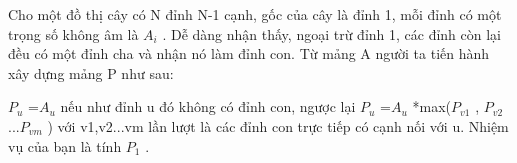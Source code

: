 Cho một đồ thị cây có N đỉnh N-1 cạnh, gốc của cây là đỉnh 1, mỗi đỉnh có một trọng số không âm là $A_{i}$   . Dễ dàng nhận thấy, ngoại trừ đỉnh 1, các đỉnh còn lại đều có một đỉnh cha và nhận nó làm đỉnh con. Từ mảng A người ta tiến hành xây dựng mảng P như sau:  

   $P_{u}$   =$A_{u}$   nếu như đỉnh u đó không có đỉnh con, ngược lại $P_{u}$   =$A_{u}$   *max($P_{v1}$   , $P_{v2}$   ...$P_{vm}$   ) với v1,v2...vm lần lượt là các đỉnh con trực tiếp có cạnh nối với u. Nhiệm vụ của bạn là tính $P_{1}$   .